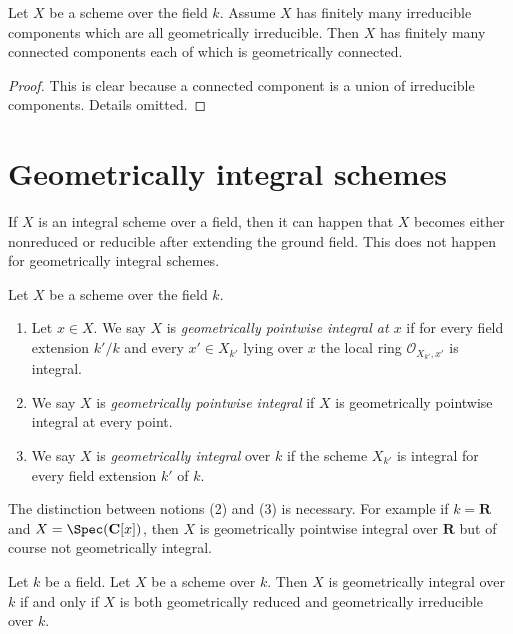 \begin{lemma}
\label{lemma-irreducible-components-geometrically-irreducible}
Let $X$ be a scheme over the field $k$.
Assume $X$ has finitely many irreducible components which are
all geometrically irreducible.
Then $X$ has finitely many connected components each of which is
geometrically connected.
\end{lemma}

\begin{proof}
This is clear because a connected component is a union of irreducible
components. Details omitted.
\end{proof}







\section{Geometrically integral schemes}
\label{section-geometrically-integral}

\noindent
If $X$ is an integral scheme over a field, then it can happen that $X$
becomes either nonreduced or reducible after extending the ground field.
This does not happen for geometrically integral schemes.

\begin{definition}
\label{definition-geometrically-integral}
Let $X$ be a scheme over the field $k$.
\begin{enumerate}
\item Let $x \in X$. We say $X$ is
{\it geometrically pointwise integral at $x$} if for every
field extension $k'/k$ and every $x' \in X_{k'}$ lying over $x$
the local ring $\mathcal{O}_{X_{k'}, x'}$ is integral.
\item We say $X$ is {\it geometrically pointwise integral} if $X$
is geometrically pointwise integral at every point.
\item We say $X$ is {\it geometrically integral} over $k$ if the scheme
$X_{k'}$ is integral for every field extension $k'$ of $k$.
\end{enumerate}
\end{definition}

\noindent
The distinction between notions (2) and (3) is necessary.
For example if $k = \mathbf{R}$ and $X = \Spec(\mathbf{C}[x])$,
then $X$ is geometrically pointwise integral over $\mathbf{R}$ but
of course not geometrically integral.

\begin{lemma}
\label{lemma-geometrically-integral}
Let $k$ be a field.
Let $X$ be a scheme over $k$.
Then $X$ is geometrically integral over $k$ if and only if
$X$ is both geometrically reduced and geometrically irreducible
over $k$.
\end{lemma}

